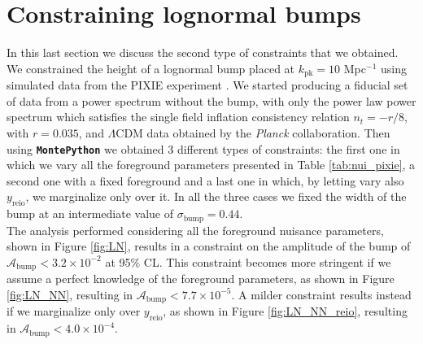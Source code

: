 \section{Constraining lognormal bumps}
In this last section we discuss the second type of constraints that we obtained. We constrained the height of a lognormal bump placed at $k_\text{pk}=10$ Mpc$^{-1}$ using simulated data from the PIXIE experiment \cite{pixie}. We started producing a fiducial set of data from a power spectrum without the bump, with only the power law power spectrum which satisfies the single field inflation consistency relation $n_t=-r/8$, with $r=0.035$, and $\Lambda$CDM data obtained by the \emph{Planck} collaboration. Then using \textbf{\texttt{MontePython}} we obtained 3 different types of constraints: the first one in which we vary all the foreground parameters presented in Table \ref{tab:nui_pixie}, a second one with a fixed foreground and a last one in which, by letting vary also $y_\text{reio}$, we marginalize only over it.  In all the three cases we fixed the width of the bump at an intermediate value of $\sigma_\text{bump}=0.44$.\\
The analysis performed considering all the foreground nuisance parameters, shown in Figure \ref{fig:LN}, results in a constraint on the amplitude of the bump of $\mathcal{A}_\text{bump}<3.2\times10^{-2}$ at 95\% CL. This constraint becomes more stringent if we assume a perfect knowledge of the foreground parameters, as shown in Figure \ref{fig:LN_NN}, resulting in $\mathcal{A}_\text{bump}<7.7\times10^{-5}$. A milder constraint results instead if we marginalize only over $y_\text{reio}$, as shown in Figure \ref{fig:LN_NN_reio}, resulting in $\mathcal{A}_\text{bump}<4.0\times10^{-4}$.\\ 

